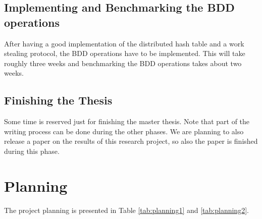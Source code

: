 \subsection{Implementing and Benchmarking the BDD operations}
After having a good implementation of the distributed hash table and a work stealing protocol, the BDD operations have to be implemented. This will take roughly three weeks and benchmarking the BDD operations takes about two weeks.

\subsection{Finishing the Thesis}
Some time is reserved just for finishing the master thesis. Note that part of the writing process can be done during the other phases. We are planning to also release a paper on the results of this research project, so also the paper is finished during this phase.

\section{Planning}
The project planning is presented in Table \ref{tab:planning1} and \ref{tab:planning2}.

